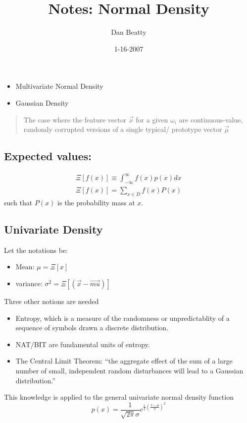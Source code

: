 \documentclass[11pt]{article}
\title{Notes: Normal Density }
\author{Dan Beatty}
\begin{document}
\maketitle

\date{1-16-2007}

\begin{itemize}
	\item Multivariate Normal Density
	\item Gaussian Density
\end{itemize}

\begin{quote}
The case where the feature vector $\vec{x}$ for a given $\omega_i$ are continuous-value, randomly corrupted versions of a single typical/ prototype vector $\vec{\mu}$ \cite[31]{duda-hart-stork}
\end{quote}

\subsection{Expected values: }
\begin{eqnarray*}
	\Xi [f(x)] \equiv \int^{\infty}_{-\infty} f(x)p(x)dx \\
	\Xi [f(x)] = \sum _{x\in D} f(x)P(x)
\end{eqnarray*}
such that $P(x)$ is the probability mass at $x$.

\subsection{Univariate Density}
Let the notations be:
\begin{itemize}
	\item Mean: $\mu = \Xi [x]$
	\item variance: $\sigma^2 = \Xi [(\vec{x} - \vec{mu})]$
\end{itemize}
Three other notions are needed 
\begin{itemize}
	\item Entropy, which is a measure of the randomness or unpredictablity of a sequence of symbols drawn a discrete distribution.
	\item NAT/BIT are fundamental units of entropy.
	\item The Central Limit Theorem: ``the aggregate effect of the sum of a large number of small, independent random disturbances will lead to a Gaussian distribution.'' \cite[33]{duda-hart-stork} 
\end{itemize}
This knowledge is applied to the general univariate normal density function 
\begin{equation}
p(x) = \frac{1}{\sqrt{2\pi} \sigma} e^{\frac{1}{2}(\frac{x - \mu}{\sigma})^2 }
\end{equation}
\end{document}
